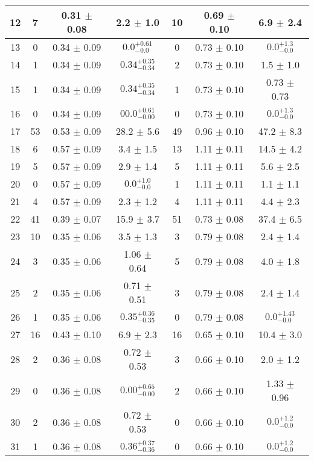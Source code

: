 \begin{table}[h!]
\begin{tabular}{c|c|c|c|c|c|c}
12 & 7  & 0.31  $\pm$  0.08  & 2.2 $\pm$ 1.0 & 10  & 0.69  $\pm$  0.10  & 6.9 $\pm$ 2.4     \\\hline
13 & 0  & 0.34  $\pm$  0.09  & $0.0 _{-0.0}^{+0.61}$ & 0  & 0.73  $\pm$  0.10  & $0.0 _{-0.0}^{+1.3}$     \\\hline
14 & 1  & 0.34  $\pm$  0.09  & $0.34^{+0.35}_{-0.34}$ & 2  & 0.73  $\pm$  0.10  & 1.5 $\pm$ 1.0     \\\hline
15 & 1  & 0.34  $\pm$  0.09  & $0.34^{+0.35}_{-0.34}$ & 1  & 0.73  $\pm$  0.10  & 0.73 $\pm$ 0.73     \\\hline
16 & 0  & 0.34  $\pm$  0.09  & $00.0 _{-0.00}^{+0.61}$ & 0  & 0.73  $\pm$  0.10  & $0.0 _{-0.0}^{+1.3}$     \\\hline
17 & 53  & 0.53  $\pm$  0.09  & 28.2 $\pm$ 5.6 & 49  & 0.96  $\pm$  0.10  & 47.2 $\pm$ 8.3     \\\hline
18 & 6  & 0.57  $\pm$  0.09  & 3.4 $\pm$ 1.5 & 13  & 1.11  $\pm$  0.11  & 14.5 $\pm$ 4.2     \\\hline
19 & 5  & 0.57  $\pm$  0.09  & 2.9 $\pm$ 1.4 & 5  & 1.11  $\pm$  0.11  & 5.6 $\pm$ 2.5     \\\hline
20 & 0  & 0.57  $\pm$  0.09  & $0.0 _{-0.0}^{+1.0}$ & 1  & 1.11  $\pm$  0.11  & 1.1 $\pm$ 1.1     \\\hline
21 & 4  & 0.57  $\pm$  0.09  & 2.3 $\pm$ 1.2 & 4  & 1.11  $\pm$  0.11  & 4.4 $\pm$ 2.3     \\\hline
22 & 41  & 0.39  $\pm$  0.07  & 15.9 $\pm$ 3.7 & 51  & 0.73  $\pm$  0.08  & 37.4 $\pm$ 6.5     \\\hline
23 & 10  & 0.35  $\pm$  0.06  & 3.5 $\pm$ 1.3 & 3  & 0.79  $\pm$  0.08  & 2.4 $\pm$ 1.4     \\\hline
24 & 3  & 0.35  $\pm$  0.06  & 1.06 $\pm$ 0.64 & 5  & 0.79  $\pm$  0.08  & 4.0 $\pm$ 1.8     \\\hline
25 & 2  & 0.35  $\pm$  0.06  & 0.71 $\pm$ 0.51 & 3  & 0.79  $\pm$  0.08  & 2.4 $\pm$ 1.4     \\\hline
26 & 1  & 0.35  $\pm$  0.06  & $0.35^{+0.36}_{-0.35}$ & 0  & 0.79  $\pm$  0.08  & $0.0 _{-0.0}^{+1.43}$     \\\hline
27 & 16  & 0.43  $\pm$  0.10  & 6.9 $\pm$ 2.3 & 16  & 0.65  $\pm$  0.10  & 10.4 $\pm$ 3.0     \\\hline
28 & 2  & 0.36  $\pm$  0.08  & 0.72 $\pm$ 0.53 & 3  & 0.66  $\pm$  0.10  & 2.0 $\pm$ 1.2     \\\hline
29 & 0  & 0.36  $\pm$  0.08  & $0.00 _{-0.00}^{+0.65}$ & 2  & 0.66  $\pm$  0.10  & 1.33 $\pm$ 0.96     \\\hline
30 & 2  & 0.36  $\pm$  0.08  & 0.72 $\pm$ 0.53 & 0  & 0.66  $\pm$  0.10  & $0.0_{-0.0}^{+1.2}$     \\\hline
31 & 1  & 0.36  $\pm$  0.08  & $0.36^{+0.37}_{-0.36}$ & 0  & 0.66  $\pm$  0.10  & $0.0_{-0.0}^{+1.2}$     \\\hline
\end{tabular}
\end{table}


